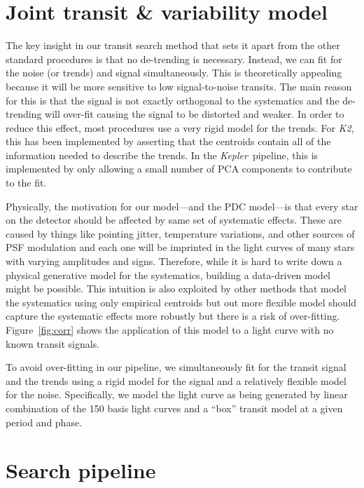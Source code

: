\documentclass[12pt,preprint]{aastex}
\newcommand{\project}[1]{\emph{#1}}
\newcommand{\kepler}{\project{Kepler}}
\newcommand{\KT}{\project{K2}}
\newcommand{\figref}[1]{\ref{fig:#1}}
\newcommand{\Fig}[1]{Figure~\figref{#1}}
\begin{document}
\section{Joint transit \& variability model}

The key insight in our transit search method that sets it apart from the
other standard procedures is that no de-trending is necessary.
Instead, we can fit for the noise (or trends) and signal simultaneously.
This is theoretically appealing because it will be more sensitive to low
signal-to-noise transits.
The main reason for this is that the signal is not exactly orthogonal to the
systematics and the de-trending will over-fit causing the signal to be
distorted and weaker.
In order to reduce this effect, most procedures use a very rigid model for
the trends.
For \KT, this has been implemented by asserting that the centroids contain
all of the information needed to describe the trends.
In the \kepler\ pipeline, this is implemented by only allowing a small number
of PCA components to contribute to the fit.

Physically, the motivation for our model---and the PDC model---is that every
star on the detector should be affected by same set of systematic effects.
These are caused by things like pointing jitter, temperature variations, and
other sources of PSF modulation and each one will be imprinted in the light
curves of many stars with varying amplitudes and signs.
Therefore, while it is hard to write down a physical generative model for the
systematics, building a data-driven model might be possible.
This intuition is also exploited by other methods that model the systematics
using only empirical centroids \citep{vanderberg-a, crossfield} but out more
flexible model should capture the systematic effects more robustly but there
is a risk of over-fitting.
\Fig{corr} shows the application of this model to a light curve with no known
transit signals.

To avoid over-fitting in our pipeline, we simultaneously fit for the transit
signal and the trends using a rigid model for the signal and a relatively
flexible model for the noise.
Specifically, we model the light curve as being generated by linear
combination of the 150 basis light curves and a ``box'' transit model at a
given period and phase.


\section{Search pipeline}
\end{document}
